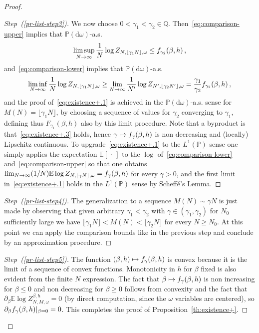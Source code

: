 \documentclass[11pt]{article}
\theoremstyle{definition}
\numberwithin{equation}{section}
\numberwithin{figure}{section}
\numberwithin{table}{section}
\newenvironment{step}[1]{\begin{proof}[#1]}{\let\qed\relax\end{proof}}
\newenvironment{laststep}[1]{\begin{proof}[#1]}{\end{proof}}
\newcommand{\gb}{\beta}
\newcommand{\go}{\omega}
\newcommand{\dd}{\mathrm{d}}
\newcommand{\tf}{\textsc{f}} %
\newcommand{\bbE}{\ensuremath{\mathbb{E}}}
\newcommand{\bbP}{\ensuremath{\mathbb{P}}}
\newcommand{\bbQ}{\ensuremath{\mathbb{Q}}}
\begin{document}
\begin{proof}
\begin{step}{Step~(\ref{pr-list-step3})}
We now choose $0<\gamma_1<\gamma_2 \in \bbQ$. Then~\eqref{eq:comparison-upper} implies that $\bbP(\dd \go)$-a.s.
\begin{equation}\label{eq:fclb1}
\limsup_{N \to \infty} \frac{1}{N} \log Z_{N, \lfloor \gamma_1 N \rfloor, \go} \le \tf_{\gamma_2} (\gb, h)\,,
\end{equation}
and~\eqref{eq:comparison-lower} implies that $\bbP(\dd \go)$-a.s.
\begin{equation}\label{eq:fclb2}
\liminf_{N \to \infty} \frac{1}{N} \log Z_{N, \lfloor \gamma_1 N \rfloor, \go} \ge
\lim_{N \to \infty} \frac{1}{N'}\log Z_{N', \lfloor \gamma_2 N' \rfloor, \go}= \frac{\gamma_1}{\gamma_2}
\tf_{\gamma_2}(\gb, h)
\,,
\end{equation}
and the proof of~\eqref{eq:existence+.1} is achieved in the $\bbP(\dd \go)$-a.s. sense for $M(N)= \lfloor\gamma_1 N \rfloor$, by choosing a sequence of values for $\gamma_2$ converging to $\gamma_1$, defining thus $F_{\gamma_1}(\gb, h)$ also by this limit procedure. Note that a byproduct is that~\eqref{eq:existence+.3} holds, hence $\gamma\mapsto \tf_\gamma(\gb, h)$ is non decreasing and (locally) Lipschitz continuous. To upgrade~\eqref{eq:existence+.1} to the $L^1(\bbP)$ sense one simply applies the expectation $\bbE[{\,\cdot\,}]$ to the $\log$ of~\eqref{eq:comparison-lower} and~\eqref{eq:comparison-upper} so that one obtains $\lim_{N \to \infty} (1/N) \bbE\log Z_{N, \lfloor \gamma N \rfloor, \go} = \tf_{\gamma}(\gb, h)$ for every $\gamma>0$, and the first limit in~\eqref{eq:existence+.1} holds in the $L^1(\bbP)$ sense by Scheffé's Lemma.
\end{step}



\begin{step}{Step~(\ref{pr-list-step4})}
The generalization to a sequence $M(N)\sim \gamma N$ is just made by observing that given arbitrary $\gamma_1< \gamma_2$ with $\gamma \in (\gamma_1, \gamma_2)$ for $N_0$ sufficiently large we have $\lfloor \gamma_1 N \rfloor < M(N) < \lfloor \gamma_2 N \rfloor$ for every $N \ge N_0$. At this point we can apply the comparison bounds like in the previous step and conclude by an approximation procedure.
\end{step}


\begin{laststep}{Step~(\ref{pr-list-step5})}
The function $(\beta,h) \mapsto \tf_\gamma(\beta,h)$ is convex because it is the limit of a sequence of convex functions. Monotonicity in $h$ for $\gb$ fixed is also evident from the finite $N$ expression. The fact that $\gb \mapsto \tf_\gamma(\beta,h)$ is non increasing for $\gb \le 0$ and non decreasing for $\gb \ge 0$ follows from convexity and the fact that $\partial _\gb \bbE \log Z_{N,M,\omega}^{\beta,h}=0$ (by direct computation, since the $\go$ variables are centered), so $\partial_\gb \tf_\gamma(\beta,h) \vert_{\gb=0}=0$. This completes the proof of Proposition~\ref{th:existence+}.
\end{laststep}
\let\qed\relax
\end{proof}
\goodbreak
\end{document}

